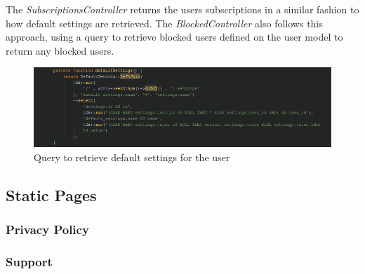 The \textit{SubscriptionsController} returns the users subscriptions in a similar fashion to how default settings are retrieved. The \textit{BlockedController} also follows this approach, using a query to retrieve blocked users defined on the user model to return any blocked users.

\begin{figure}[H]
\centering
\includegraphics[width=\textwidth]{Images/Implementation/UserDefaultSettings}
\caption{Query to retrieve default settings for the user}
\label{fig:UserDefaultSettings}
\end{figure}

\subsection{Static Pages}
\subsubsection{Privacy Policy}
\subsubsection{Support}
